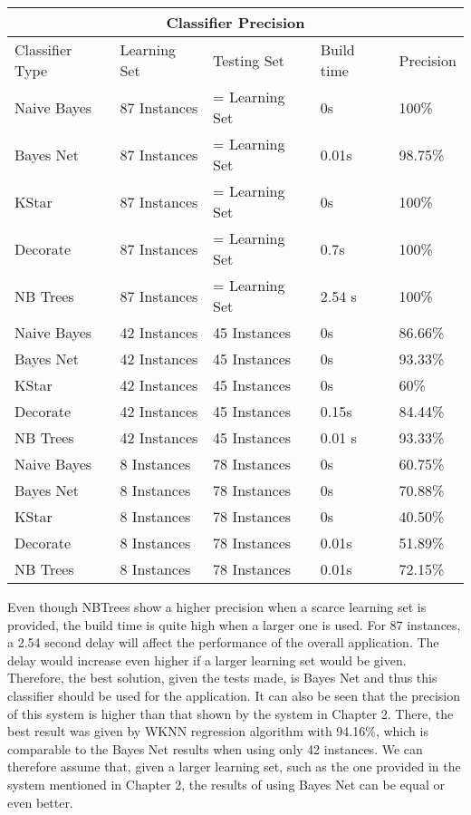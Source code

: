 \begin{tabular}{ |p{3cm}|p{3cm}|p{3cm}|p{2cm}|p{2cm}| }
 \hline
 \multicolumn{5}{|c|}{Classifier Precision} \\
 \hline
 Classifier Type & Learning Set & Testing Set & Build time & Precision\\
 \hline
 Naive Bayes & 87 Instances & = Learning Set & 0s & 100\% \\
 Bayes Net   & 87 Instances & = Learning Set & 0.01s & 98.75\% \\
 KStar       & 87 Instances & = Learning Set & 0s & 100\% \\
 Decorate    & 87 Instances & = Learning Set & 0.7s & 100\% \\
 NB Trees    & 87 Instances & = Learning Set & 2.54 s & 100\% \\
 Naive Bayes & 42 Instances & 45 Instances   & 0s & 86.66\% \\
 Bayes Net   & 42 Instances & 45 Instances   & 0s & 93.33\% \\
 KStar       & 42 Instances & 45 Instances   & 0s & 60\% \\
 Decorate    & 42 Instances & 45 Instances   & 0.15s & 84.44\% \\
 NB Trees    & 42 Instances & 45 Instances   & 0.01 s & 93.33\% \\
 Naive Bayes & 8 Instances  & 78 Instances   & 0s & 60.75\% \\
 Bayes Net   & 8 Instances  & 78 Instances   & 0s & 70.88\% \\
 KStar       & 8 Instances  & 78 Instances   & 0s & 40.50\% \\
 Decorate    & 8 Instances  & 78 Instances   & 0.01s & 51.89\% \\
 NB Trees    & 8 Instances  & 78 Instances   & 0.01s & 72.15\% \\
 \hline
\end{tabular}

\medskip \noindent Even though NBTrees show a higher precision when a scarce learning set is provided, the build time is quite high when a larger one is used. For 87 instances, a 2.54 second delay will affect the performance of the overall application. The delay would increase even higher if a larger learning set would be given. Therefore, the best solution, given the tests made, is Bayes Net and thus this classifier should be used for the application.
It can also be seen that the precision of this system is higher than that shown by the system in Chapter 2. There, the best result was given by WKNN regression algorithm with 94.16\%, which is comparable to the Bayes Net results when using only 42 instances. We can therefore assume that, given a larger learning set, such as the one provided in the system mentioned in Chapter 2, the results of using Bayes Net can be equal or even better.


